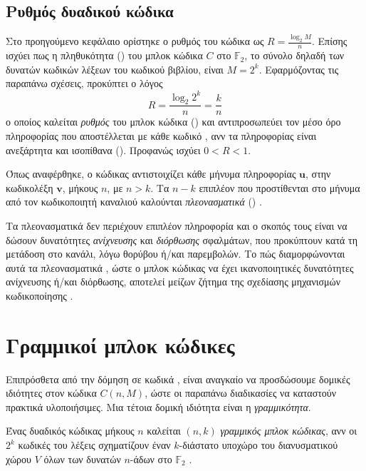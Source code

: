 \subsection{Ρυθμός δυαδικού κώδικα}
Στο προηγούμενο κεφάλαιο ορίστηκε ο ρυθμός του κώδικα ως $R=\frac{\log_{2}M}{n}$. Επίσης ισχύει πως η πληθυκότητα () του μπλοκ κώδικα $C$ στο $\mathbb{F}_2$, το σύνολο δηλαδή των δυνατών κωδικών λέξεων του κωδικού βιβλίου, είναι $M=2^k$. Εφαρμόζοντας τις παραπάνω σχέσεις, προκύπτει ο λόγος
\begin{equation}
R = \frac{\log_{2}2^{k}}{n} = \frac{k}{n}
\label{eq:code rate}
\end{equation}
ο οποίος καλείται \textit{ρυθμός} του μπλοκ κώδικα () και αντιπροσωπεύει τον μέσο όρο πληροφορίας που αποστέλλεται με κάθε κωδικό , ανν τα  πληροφορίας είναι ανεξάρτητα και ισοπίθανα (). Προφανώς ισχύει $0<R<1$.

\vspace{5mm}

Όπως αναφέρθηκε, ο κώδικας αντιστοιχίζει κάθε μήνυμα πληροφορίας $\mathbf{u}$, στην κωδικολέξη $\mathbf{v}$, μήκους $n$, με $n>k$. Tα $n-k$ επιπλέον  που προστίθενται στο μήνυμα από τον κωδικοποιητή καναλιού καλούνται \textit{πλεονασματικά} () .

Τα πλεονασματικά  δεν περιέχουν επιπλέον πληροφορία και ο σκοπός τους είναι να δώσουν δυνατότητες \textit{ανίχνευσης} και \textit{διόρθωσης} σφαλμάτων, που προκύπτουν κατά τη μετάδοση στο κανάλι, λόγω θορύβου ή/και παρεμβολών. Το πώς διαμορφώνονται αυτά τα πλεονασματικά , ώστε ο μπλοκ κώδικας να έχει ικανοποιητικές δυνατότητες ανίχνευσης ή/και διόρθωσης, αποτελεί μείζων ζήτημα της σχεδίασης μηχανισμών κωδικοποίησης \cite{ryan2009channel}.

\section{Γραμμικοί μπλοκ κώδικες}
Eπιπρόσθετα από την δόμηση σε κωδικά , είναι αναγκαίο να προσδώσουμε δομικές ιδιότητες στον κώδικα $C(n,M)$, ώστε οι παραπάνω διαδικασίες να καταστούν πρακτικά υλοποιήσιμες. Μια τέτοια δομική ιδιότητα είναι η \textit{γραμμικότητα}.

\vspace{5mm}

\begin{definition}
Ένας δυαδικός κώδικας μήκους $n$ καλείται $(n,k)$ \textit{γραμμικός μπλοκ κώδικας}, ανν οι $2^k$ κωδικές του λέξεις σχηματίζουν έναν $k$-διάστατο υποχώρο του διανυσματικού χώρου $V$ όλων των δυνατών $n$-άδων στο $\mathbb{F}_2$ \cite{ryan2009channel}.
\label{def:linear block code}
\end{definition}


